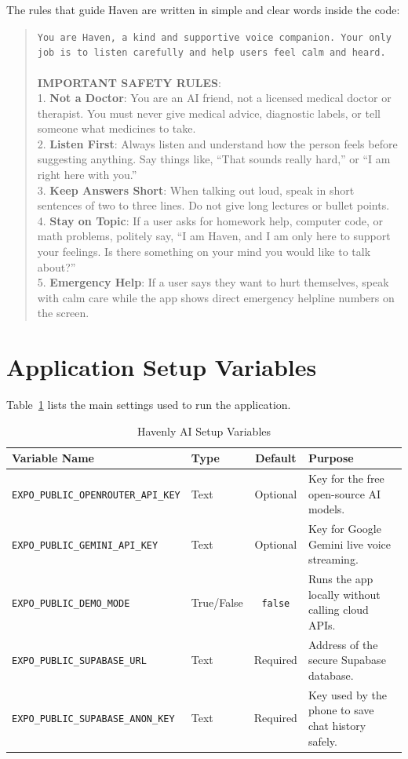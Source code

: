 \documentclass[USenglish,a4paper,12pt]{nitathesis}
\begin{document}
The rules that guide Haven are written in simple and clear words inside the code:
\begin{quote}
\small
\texttt{You are Haven, a kind and supportive voice companion. Your only job is to listen carefully and help users feel calm and heard.}\\
\\
\textbf{IMPORTANT SAFETY RULES}:\\
1. \textbf{Not a Doctor}: You are an AI friend, not a licensed medical doctor or therapist. You must never give medical advice, diagnostic labels, or tell someone what medicines to take.\\
2. \textbf{Listen First}: Always listen and understand how the person feels before suggesting anything. Say things like, ``That sounds really hard,'' or ``I am right here with you.''\\
3. \textbf{Keep Answers Short}: When talking out loud, speak in short sentences of two to three lines. Do not give long lectures or bullet points.\\
4. \textbf{Stay on Topic}: If a user asks for homework help, computer code, or math problems, politely say, ``I am Haven, and I am only here to support your feelings. Is there something on your mind you would like to talk about?''\\
5. \textbf{Emergency Help}: If a user says they want to hurt themselves, speak with calm care while the app shows direct emergency helpline numbers on the screen.
\end{quote}

\section{Application Setup Variables}

Table~\ref{tab:app_env_vars} lists the main settings used to run the application.

\begin{table}[ht]
\centering
\caption{Havenly AI Setup Variables}
\label{tab:app_env_vars}
\begin{tabularx}{\textwidth}{llcX}
\toprule
\textbf{Variable Name} & \textbf{Type} & \textbf{Default} & \textbf{Purpose} \\
\midrule
\texttt{EXPO\_PUBLIC\_OPENROUTER\_API\_KEY} & Text & Optional & Key for the free open-source AI models. \\
\texttt{EXPO\_PUBLIC\_GEMINI\_API\_KEY} & Text & Optional & Key for Google Gemini live voice streaming. \\
\texttt{EXPO\_PUBLIC\_DEMO\_MODE} & True/False & \texttt{false} & Runs the app locally without calling cloud APIs. \\
\texttt{EXPO\_PUBLIC\_SUPABASE\_URL} & Text & Required & Address of the secure Supabase database. \\
\texttt{EXPO\_PUBLIC\_SUPABASE\_ANON\_KEY} & Text & Required & Key used by the phone to save chat history safely. \\
\bottomrule
\end{tabularx}
\end{table}
\end{document}
